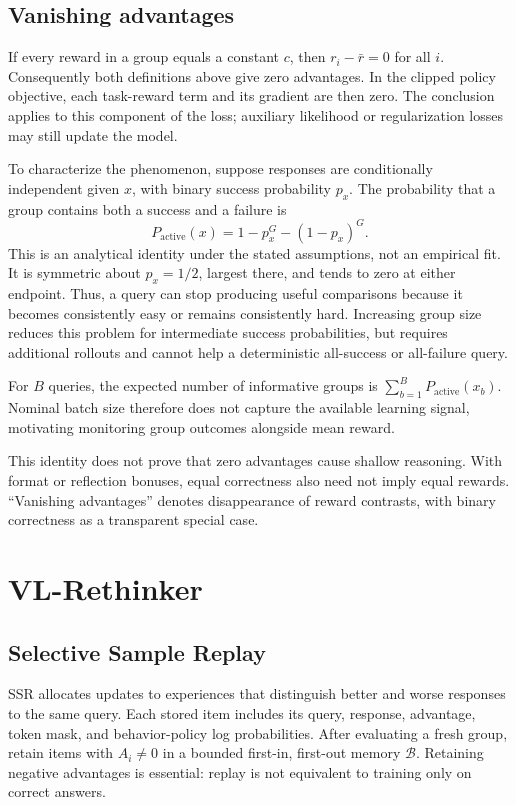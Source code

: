 \documentclass[10pt,twocolumn]{article}
\begin{document}
\subsection{Vanishing advantages}
If every reward in a group equals a constant $c$, then $r_i-\bar r=0$ for all $i$. Consequently both definitions above give zero advantages. In the clipped policy objective, each task-reward term and its gradient are then zero. The conclusion applies to this component of the loss; auxiliary likelihood or regularization losses may still update the model.

To characterize the phenomenon, suppose responses are conditionally independent given $x$, with binary success probability $p_x$. The probability that a group contains both a success and a failure is
\begin{equation}
 P_{\mathrm{active}}(x)=1-p_x^G-(1-p_x)^G.
 \label{eq:active}
\end{equation}
This is an analytical identity under the stated assumptions, not an empirical fit. It is symmetric about $p_x=1/2$, largest there, and tends to zero at either endpoint. Thus, a query can stop producing useful comparisons because it becomes consistently easy or remains consistently hard. Increasing group size reduces this problem for intermediate success probabilities, but requires additional rollouts and cannot help a deterministic all-success or all-failure query.

For $B$ queries, the expected number of informative groups is $\sum_{b=1}^{B}P_{\mathrm{active}}(x_b)$. Nominal batch size therefore does not capture the available learning signal, motivating monitoring group outcomes alongside mean reward.

This identity does not prove that zero advantages cause shallow reasoning. With format or reflection bonuses, equal correctness also need not imply equal rewards. ``Vanishing advantages'' denotes disappearance of reward contrasts, with binary correctness as a transparent special case.

\section{VL-Rethinker}
\label{sec:method}
\subsection{Selective Sample Replay}
\label{sec:ssr}
SSR allocates updates to experiences that distinguish better and worse responses to the same query. Each stored item includes its query, response, advantage, token mask, and behavior-policy log probabilities. After evaluating a fresh group, retain items with $A_i\ne0$ in a bounded first-in, first-out memory $\mathcal B$. Retaining negative advantages is essential: replay is not equivalent to training only on correct answers.
\end{document}
